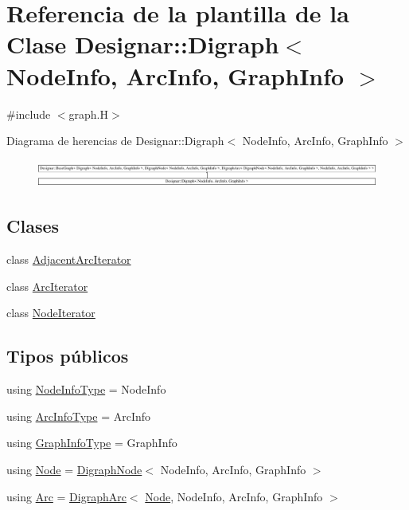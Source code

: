 \hypertarget{class_designar_1_1_digraph}{}\section{Referencia de la plantilla de la Clase Designar\+:\+:Digraph$<$ Node\+Info, Arc\+Info, Graph\+Info $>$}
\label{class_designar_1_1_digraph}


{\ttfamily \#include $<$graph.\+H$>$}

Diagrama de herencias de Designar\+:\+:Digraph$<$ Node\+Info, Arc\+Info, Graph\+Info $>$\begin{figure}[H]
\begin{center}
\leavevmode
\includegraphics[height=0.921053cm]{class_designar_1_1_digraph}
\end{center}
\end{figure}
\subsection*{Clases}
\begin{DoxyCompactItemize}
\item 
class \hyperlink{class_designar_1_1_digraph_1_1_adjacent_arc_iterator}{Adjacent\+Arc\+Iterator}
\item 
class \hyperlink{class_designar_1_1_digraph_1_1_arc_iterator}{Arc\+Iterator}
\item 
class \hyperlink{class_designar_1_1_digraph_1_1_node_iterator}{Node\+Iterator}
\end{DoxyCompactItemize}
\subsection*{Tipos públicos}
\begin{DoxyCompactItemize}
\item 
using \hyperlink{class_designar_1_1_digraph_a6438608ff27cb6f017705e18bd7fc478}{Node\+Info\+Type} = Node\+Info
\item 
using \hyperlink{class_designar_1_1_digraph_a84a736f6c32da0fcbd1d047e74264d00}{Arc\+Info\+Type} = Arc\+Info
\item 
using \hyperlink{class_designar_1_1_digraph_a2baffbb176ff86becd7452d2acc0ca74}{Graph\+Info\+Type} = Graph\+Info
\item 
using \hyperlink{class_designar_1_1_digraph_a4dc921c41a480b7946a04170e997d8ae}{Node} = \hyperlink{class_designar_1_1_digraph_node}{Digraph\+Node}$<$ Node\+Info, Arc\+Info, Graph\+Info $>$
\item 
using \hyperlink{class_designar_1_1_digraph_a0ceb278671f2a535c00fddccdeafd69f}{Arc} = \hyperlink{class_designar_1_1_digraph_arc}{Digraph\+Arc}$<$ \hyperlink{class_designar_1_1_digraph_a4dc921c41a480b7946a04170e997d8ae}{Node}, Node\+Info, Arc\+Info, Graph\+Info $>$
\end{DoxyCompactItemize}
